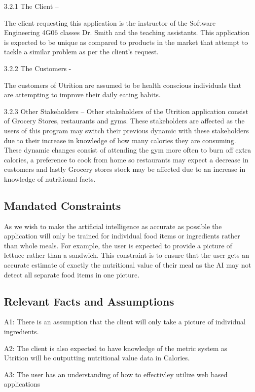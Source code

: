 \documentclass[12pt]{article}
\begin{document}
3.2.1 The Client –  

The client requesting this application is the instructor of the Software Engineering 4G06 classes Dr. Smith and the teaching assistants. This application is expected to be unique as compared to products in the market that attempt to tackle a similar problem as per the client's request.  

3.2.2 The Customers -  

The customers of Utrition are assumed to be health conscious individuals that are attempting to improve their daily eating habits. 

3.2.3 Other Stakeholders – Other stakeholders of the Utrition application consist of Grocery Stores, restaurants and gyms. These stakeholders are affected as the users of this program may switch their previous dynamic with these stakeholders due to their increase in knowledge of how many calories they are consuming. These dynamic changes consist of attending the gym more often to burn off extra calories, a preference to cook from home so restaurants may expect a decrease in customers and lastly Grocery stores stock may be affected due to an increase in knowledge of nutritional facts. 

\subsection{Mandated Constraints} 

As we wish to make the artificial intelligence as accurate as possible the application will only be trained for individual food items or ingredients rather than whole meals. For example, the user is expected to provide a picture of lettuce rather than a sandwich. This constraint is to ensure that the user gets an accurate estimate of exactly the nutritional value of their meal as the AI may not detect all separate food items in one picture. 

\subsection{Relevant Facts and Assumptions } 


A1: There is an assumption that the client will only take a picture of individual ingredients. 

A2: The client is also expected to have knowledge of the metric system as Utrition will be outputting nutritional value data in Calories.

A3: The user has an understanding of how to effectivley utilize web based applications
\end{document}
